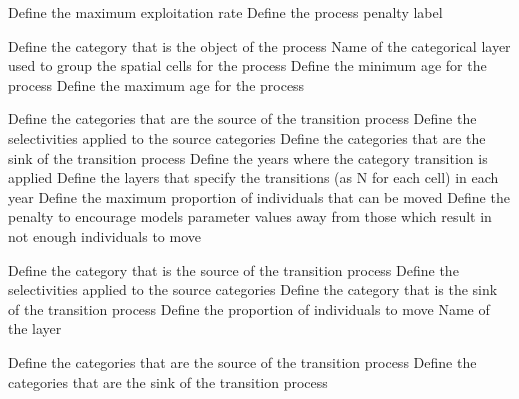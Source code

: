  {Define the maximum exploitation rate}
 {Define the process penalty label}
\par\textbf{}\par
{} {Define the category that is the object of the process}
 {Name of the categorical layer used to group the spatial cells for the process}
 {Define the minimum age for the process }
 {Define the maximum age for the process}
\par\textbf{}\par
{} {Define the categories that are the source of the transition process}
 {Define the selectivities applied to the source categories}
 {Define the categories that are the sink of the transition process}
 {Define the years where the category transition is applied}
 {Define the layers that specify the transitions (as N for each cell) in each year}
 {Define the maximum proportion of individuals that can be moved}
 {Define the penalty to encourage models parameter values away from those which result in not enough individuals to move}
\par\textbf{}\par
{} {Define the category that is the source of the transition process}
 {Define the selectivities applied to the source categories}
 {Define the category that is the sink of the transition process}
 {Define the proportion of individuals to move}
 {Name of the layer}
\par\textbf{}\par
{} {Define the categories that are the source of the transition process}
 {Define the categories that are the sink of the transition process}
